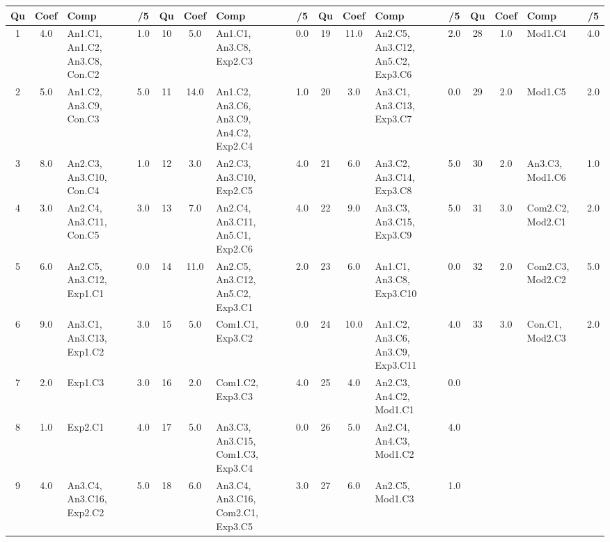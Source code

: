\begin{center} 
\begin{tabular}{|c|c|m{1cm}|c||c|c|m{1cm}|c||c|c|m{1cm}|c||c|c|m{1cm}|c|} 
\hline \textbf{Qu} & \textbf{Coef} & \textbf{Comp} & \textbf{/5} & \textbf{Qu} & \textbf{Coef} & \textbf{Comp} & \textbf{/5} & \textbf{Qu} & \textbf{Coef} & \textbf{Comp} & \textbf{/5} & \textbf{Qu} & \textbf{Coef} & \textbf{Comp} & \textbf{/5} \\ 
\hline 
\hline 
1 & 4.0 & An1.C1, An1.C2, An3.C8, Con.C2 & 1.0 & 10 & 5.0 & An1.C1, An3.C8, Exp2.C3 & 0.0 & 19 & 11.0 & An2.C5, An3.C12, An5.C2, Exp3.C6 & 2.0 & 28 & 1.0 & Mod1.C4 & 4.0 \\ \hline 
2 & 5.0 & An1.C2, An3.C9, Con.C3 & 5.0 & 11 & 14.0 & An1.C2, An3.C6, An3.C9, An4.C2, Exp2.C4 & 1.0 & 20 & 3.0 & An3.C1, An3.C13, Exp3.C7 & 0.0 & 29 & 2.0 & Mod1.C5 & 2.0 \\ \hline 
3 & 8.0 & An2.C3, An3.C10, Con.C4 & 1.0 & 12 & 3.0 & An2.C3, An3.C10, Exp2.C5 & 4.0 & 21 & 6.0 & An3.C2, An3.C14, Exp3.C8 & 5.0 & 30 & 2.0 & An3.C3, Mod1.C6 & 1.0 \\ \hline 
4 & 3.0 & An2.C4, An3.C11, Con.C5 & 3.0 & 13 & 7.0 & An2.C4, An3.C11, An5.C1, Exp2.C6 & 4.0 & 22 & 9.0 & An3.C3, An3.C15, Exp3.C9 & 5.0 & 31 & 3.0 & Com2.C2, Mod2.C1 & 2.0 \\ \hline 
5 & 6.0 & An2.C5, An3.C12, Exp1.C1 & 0.0 & 14 & 11.0 & An2.C5, An3.C12, An5.C2, Exp3.C1 & 2.0 & 23 & 6.0 & An1.C1, An3.C8, Exp3.C10 & 0.0 & 32 & 2.0 & Com2.C3, Mod2.C2 & 5.0 \\ \hline 
6 & 9.0 & An3.C1, An3.C13, Exp1.C2 & 3.0 & 15 & 5.0 & Com1.C1, Exp3.C2 & 0.0 & 24 & 10.0 & An1.C2, An3.C6, An3.C9, Exp3.C11 & 4.0 & 33 & 3.0 & Con.C1, Mod2.C3 & 2.0 \\ \hline 
7 & 2.0 & Exp1.C3 & 3.0 & 16 & 2.0 & Com1.C2, Exp3.C3 & 4.0 & 25 & 4.0 & An2.C3, An4.C2, Mod1.C1 & 0.0 &  &  &  &  \\ \hline 

8 & 1.0 & Exp2.C1 & 4.0 & 17 & 5.0 & An3.C3, An3.C15, Com1.C3, Exp3.C4 & 0.0 & 26 & 5.0 & An2.C4, An4.C3, Mod1.C2 & 4.0 &  &  &  &  \\ \hline 

9 & 4.0 & An3.C4, An3.C16, Exp2.C2 & 5.0 & 18 & 6.0 & An3.C4, An3.C16, Com2.C1, Exp3.C5 & 3.0 & 27 & 6.0 & An2.C5, Mod1.C3 & 1.0 &  &  &  &  \\ \hline 

\end{tabular} 
\end{center} 
\normalsize 
 
